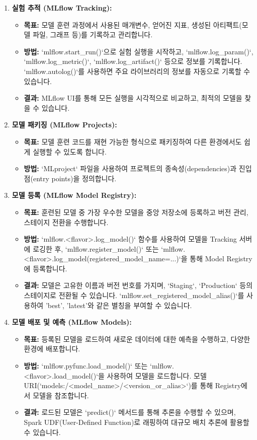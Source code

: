 \documentclass[11pt,a4paper]{article}
\begin{document}
\begin{enumerate}
    \item \textbf{실험 추적 (MLflow Tracking):}
    \begin{itemize}
        \item \textbf{목표:} 모델 훈련 과정에서 사용된 매개변수, 얻어진 지표, 생성된 아티팩트(모델 파일, 그래프 등)를 기록하고 관리합니다.
        \item \textbf{방법:} `mlflow.start_run()`으로 실험 실행을 시작하고, `mlflow.log_param()`, `mlflow.log_metric()`, `mlflow.log_artifact()` 등으로 정보를 기록합니다. `mlflow.autolog()`를 사용하면 주요 라이브러리의 정보를 자동으로 기록할 수 있습니다.
        \item \textbf{결과:} MLflow UI를 통해 모든 실행을 시각적으로 비교하고, 최적의 모델을 찾을 수 있습니다.
    \end{itemize}
    \item \textbf{모델 패키징 (MLflow Projects):}
    \begin{itemize}
        \item \textbf{목표:} 모델 훈련 코드를 재현 가능한 형식으로 패키징하여 다른 환경에서도 쉽게 실행할 수 있도록 합니다.
        \item \textbf{방법:} `MLproject` 파일을 사용하여 프로젝트의 종속성(dependencies)과 진입점(entry points)을 정의합니다.
    \end{itemize}
    \item \textbf{모델 등록 (MLflow Model Registry):}
    \begin{itemize}
        \item \textbf{목표:} 훈련된 모델 중 가장 우수한 모델을 중앙 저장소에 등록하고 버전 관리, 스테이지 전환을 수행합니다.
        \item \textbf{방법:} `mlflow.<flavor>.log_model()` 함수를 사용하여 모델을 Tracking 서버에 로깅한 후, `mlflow.register_model()` 또는 `mlflow.<flavor>.log_model(registered_model_name=...)`을 통해 Model Registry에 등록합니다.
        \item \textbf{결과:} 모델은 고유한 이름과 버전 번호를 가지며, `Staging`, `Production` 등의 스테이지로 전환될 수 있습니다. `mlflow.set_registered_model_alias()`를 사용하여 'best', 'latest'와 같은 별칭을 부여할 수 있습니다.
    \end{itemize}
    \item \textbf{모델 배포 및 예측 (MLflow Models):}
    \begin{itemize}
        \item \textbf{목표:} 등록된 모델을 로드하여 새로운 데이터에 대한 예측을 수행하고, 다양한 환경에 배포합니다.
        \item \textbf{방법:} `mlflow.pyfunc.load_model()` 또는 `mlflow.<flavor>.load_model()`을 사용하여 모델을 로드합니다. 모델 URI(`models:/<model_name>/<version_or_alias>`)를 통해 Registry에서 모델을 참조합니다.
        \item \textbf{결과:} 로드된 모델은 `predict()` 메서드를 통해 추론을 수행할 수 있으며, Spark UDF(User-Defined Function)로 래핑하여 대규모 배치 추론에 활용할 수 있습니다.
    \end{itemize}
\end{enumerate}
\end{document}
